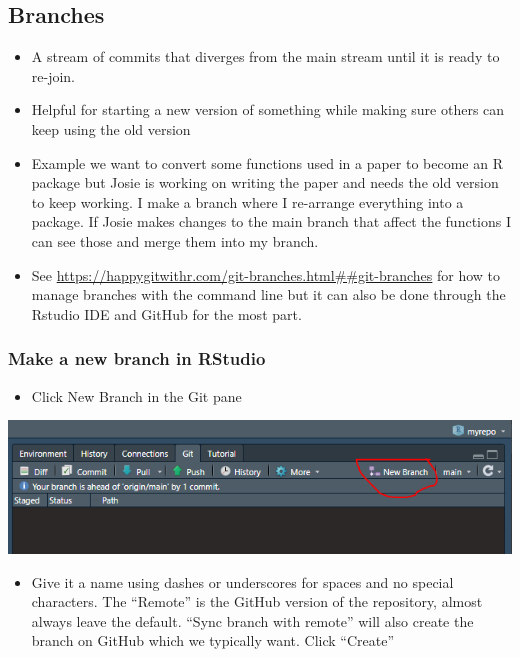 \documentclass[
  letterpaper,
  DIV=11,
  numbers=noendperiod]{scrreprt}
\providecommand{\tightlist}{%
  \setlength{\itemsep}{0pt}\setlength{\parskip}{0pt}}\usepackage{longtable,booktabs,array}
\begin{document}
\hypertarget{branches}{%
\subsection{Branches}\label{branches}}

\begin{itemize}
\tightlist
\item
  A stream of commits that diverges from the main stream until it is
  ready to re-join.
\item
  Helpful for starting a new version of something while making sure
  others can keep using the old version
\item
  Example we want to convert some functions used in a paper to become an
  R package but Josie is working on writing the paper and needs the old
  version to keep working. I make a branch where I re-arrange everything
  into a package. If Josie makes changes to the main branch that affect
  the functions I can see those and merge them into my branch.
\item
  See \url{https://happygitwithr.com/git-branches.html\#\#git-branches}
  for how to manage branches with the command line but it can also be
  done through the Rstudio IDE and GitHub for the most part.
\end{itemize}

\hypertarget{make-a-new-branch-in-rstudio}{%
\subsubsection{Make a new branch in
RStudio}\label{make-a-new-branch-in-rstudio}}

\begin{itemize}
\tightlist
\item
  Click New Branch in the Git pane
\end{itemize}

\includegraphics{assets/img/new_branch.png}

\begin{itemize}
\tightlist
\item
  Give it a name using dashes or underscores for spaces and no special
  characters. The ``Remote'' is the GitHub version of the repository,
  almost always leave the default. ``Sync branch with remote'' will also
  create the branch on GitHub which we typically want. Click ``Create''
\end{itemize}
\end{document}
